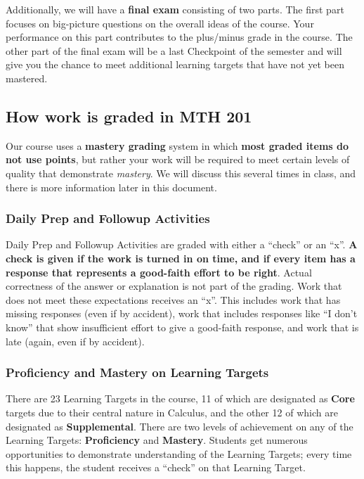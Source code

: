 \documentclass[]{article}
\begin{document}
Additionally, we will have a \textbf{final exam} consisting of two
parts. The first part focuses on big-picture questions on the overall
ideas of the course. Your performance on this part contributes to the
plus/minus grade in the course. The other part of the final exam will be
a last Checkpoint of the semester and will give you the chance to meet
additional learning targets that have not yet been mastered.

\hypertarget{how-work-is-graded-in-mth-201}{%
\subsection{How work is graded in MTH
201}\label{how-work-is-graded-in-mth-201}}

Our course uses a \textbf{mastery grading} system in which \textbf{most
graded items do not use points}, but rather your work will be required
to meet certain levels of quality that demonstrate \emph{mastery}. We
will discuss this several times in class, and there is more information
later in this document.

\hypertarget{daily-prep-and-followup-activities}{%
\subsubsection{Daily Prep and Followup
Activities}\label{daily-prep-and-followup-activities}}

Daily Prep and Followup Activities are graded with either a ``check'' or
an ``x''. \textbf{A check is given if the work is turned in on time, and
if every item has a response that represents a good-faith effort to be
right}. Actual correctness of the answer or explanation is not part of
the grading. Work that does not meet these expectations receives an
``x''. This includes work that has missing responses (even if by
accident), work that includes responses like ``I don't know'' that show
insufficient effort to give a good-faith response, and work that is late
(again, even if by accident).

\hypertarget{proficiency-and-mastery-on-learning-targets}{%
\subsubsection{Proficiency and Mastery on Learning
Targets}\label{proficiency-and-mastery-on-learning-targets}}

There are 23 Learning Targets in the course, 11 of which are designated
as \textbf{Core} targets due to their central nature in Calculus, and
the other 12 of which are designated as \textbf{Supplemental}. There are
two levels of achievement on any of the Learning Targets:
\textbf{Proficiency} and \textbf{Mastery}. Students get numerous
opportunities to demonstrate understanding of the Learning Targets;
every time this happens, the student receives a ``check'' on that
Learning Target.
\end{document}
